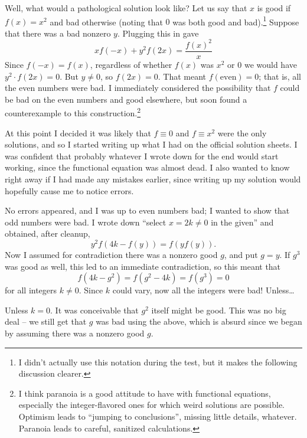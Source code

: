 \documentclass[11pt]{scrartcl}
\begin{document}
Well, what would a pathological solution look like? Let us say that $x$ is good if $f(x) = x^2$ and bad otherwise (noting that $0$ was both good and bad).\footnote{I didn't actually use this notation during the test, but it makes the following discussion clearer.} Suppose that there was a bad nonzero $y$. Plugging this in gave
\[ xf(-x) + y^2 f(2x) = \frac{f(x)^2}{x} \]
Since $f(-x) = f(x)$, regardless of whether $f(x)$ was $x^2$ or $0$ we would have $y^2 \cdot f(2x) = 0$. But $y \neq 0$, so $f(2x) = 0$.
That meant $f(\text{even}) = 0$; that is, all the even numbers were bad.
I immediately considered the possibility that $f$ could be bad on the even numbers and good elsewhere, but soon found a counterexample to this construction.\footnote{I think paranoia is a good attitude to have with functional equations, especially the integer-flavored ones for which weird solutions are possible. Optimism leads to ``jumping to conclusions'', missing little details, whatever. Paranoia leads to careful, sanitized calculations.}

At this point I decided it was likely that $f \equiv 0$ and $f \equiv x^2$ were the only solutions, and so I started writing up what I had on the official solution sheets. I was confident that probably whatever I wrote down for the end would start working, since the functional equation was almost dead.
I also wanted to know right away if I had made any mistakes earlier, since writing up my solution would hopefully cause me to notice errors.

No errors appeared, and I was up to even numbers bad; I wanted to show that odd numbers were bad. I wrote down ``select $x=2k \neq 0$ in the given'' and obtained, after cleanup,
\[ y^2 f(4k - f(y)) = f(yf(y)). \]
Now I assumed for contradiction there was a nonzero good $g$, and put $g=y$.
If $g^3$ was good as well, this led to an immediate contradiction, so this meant that
\[ f(4k-g^2) = f(g^2-4k) = f(g^3) = 0 \]
for all integers $k \neq 0$. Since $k$ could vary, now all the integers were bad! Unless\dots

Unless $k=0$. It was conceivable that $g^2$ itself might be good.
This was no big deal -- we still get that $g$ was bad using the above, which is absurd since we began by assuming there was a nonzero good $g$.
\end{document}
